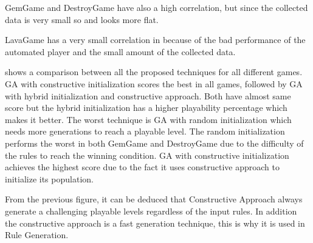 

GemGame and DestroyGame have also a high correlation, but since the collected data is very small so  and  looks more flat.



LavaGame has a very small correlation in  because of the bad performance of the automated player and the small amount of the collected data.


 shows a comparison between all the proposed techniques for all different games. GA with constructive initialization scores the best in all games, followed by GA with hybrid initialization and constructive approach. Both have almost same score but the hybrid initialization has a higher playability percentage which makes it better. The worst technique is GA with random initialization which needs more generations to reach a playable level. The random initialization performs the worst in both GemGame and DestroyGame due to the difficulty of the rules to reach the winning condition. GA with constructive initialization achieves the highest score due to the fact it uses constructive approach to initialize its population.


From the previous figure, it can be deduced that Constructive Approach always generate a challenging playable levels regardless of the input rules. In addition the constructive approach is a fast generation technique, this is why it is used in Rule Generation.

